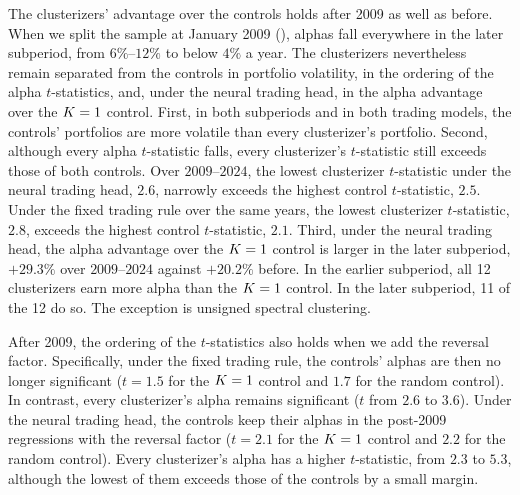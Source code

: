 The clusterizers' advantage over the controls holds after 2009 as well as before. When we split the sample at January 2009 (), alphas fall everywhere in the later subperiod, from $6\%$--$12\%$ to below $4\%$ a year. The clusterizers nevertheless remain separated from the controls in portfolio volatility, in the ordering of the alpha $t$-statistics, and, under the neural trading head, in the alpha advantage over the $K=1$ control. First, in both subperiods and in both trading models, the controls' portfolios are more volatile than every clusterizer's portfolio. Second, although every alpha $t$-statistic falls, every clusterizer's $t$-statistic still exceeds those of both controls. Over $2009$--$2024$, the lowest clusterizer $t$-statistic under the neural trading head, $2.6$, narrowly exceeds the highest control $t$-statistic, $2.5$. Under the fixed trading rule over the same years, the lowest clusterizer $t$-statistic, $2.8$, exceeds the highest control $t$-statistic, $2.1$. Third, under the neural trading head, the alpha advantage over the $K=1$ control is larger in the later subperiod, $+29.3\%$ over $2009$--$2024$ against $+20.2\%$ before. In the earlier subperiod, all 12 clusterizers earn more alpha than the $K=1$ control. In the later subperiod, 11 of the 12 do so. The exception is unsigned spectral clustering.

After 2009, the ordering of the $t$-statistics also holds when we add the reversal factor. Specifically, under the fixed trading rule, the controls' alphas are then no longer significant ($t = 1.5$ for the $K=1$ control and $1.7$ for the random control). In contrast, every clusterizer's alpha remains significant ($t$ from $2.6$ to $3.6$). Under the neural trading head, the controls keep their alphas in the post-2009 regressions with the reversal factor ($t = 2.1$ for the $K=1$ control and $2.2$ for the random control). Every clusterizer's alpha has a higher $t$-statistic, from $2.3$ to $5.3$, although the lowest of them exceeds those of the controls by a small margin.

